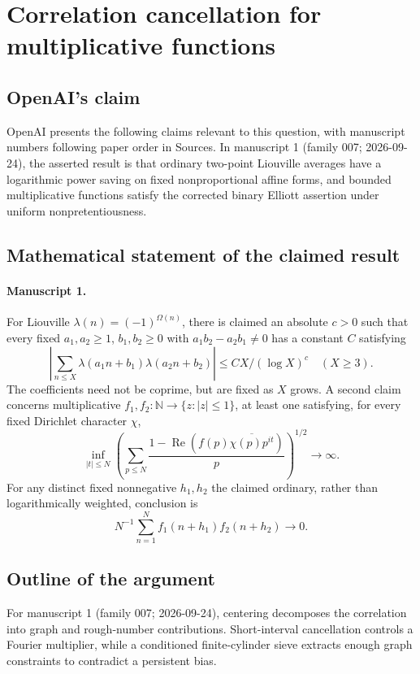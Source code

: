\documentclass[11pt]{article}
\begin{document}
\section*{Correlation cancellation for multiplicative functions}

\subsection{OpenAI's claim}
OpenAI presents the following claims relevant to this question, with manuscript numbers following paper order in Sources. In manuscript 1 (family 007; 2026-09-24), the asserted result is that ordinary two-point Liouville averages have a logarithmic power saving on fixed nonproportional affine forms, and bounded multiplicative functions satisfy the corrected binary Elliott assertion under uniform nonpretentiousness.

\subsection{Mathematical statement of the claimed result}
\paragraph{Manuscript 1.}
For Liouville $\lambda(n)=(-1)^{\Omega(n)}$, there is claimed an absolute $c>0$ such that every fixed $a_1,a_2\ge1$, $b_1,b_2\ge0$ with $a_1b_2-a_2b_1\ne0$ has a constant $C$ satisfying
\[
 |\sum_{n\le X}\lambda(a_1n+b_1)\lambda(a_2n+b_2)|\le C X/(\log X)^c\quad(X\ge3).
\]
The coefficients need not be coprime, but are fixed as $X$ grows. A second claim concerns multiplicative $f_1,f_2:\mathbb N\to\{z:|z|\le1\}$, at least one satisfying, for every fixed Dirichlet character $\chi$,
\[
 \inf_{|t|\le N}\left(\sum_{p\le N}\frac{1-\operatorname{Re}(f(p)\overline{\chi(p)p^{it}})}p\right)^{1/2}\longrightarrow\infty.
\]
For any distinct fixed nonnegative $h_1,h_2$ the claimed ordinary, rather than logarithmically weighted, conclusion is
\[
 N^{-1}\sum_{n=1}^Nf_1(n+h_1)f_2(n+h_2)\longrightarrow0.
\]

\subsection{Outline of the argument}
For manuscript 1 (family 007; 2026-09-24), centering decomposes the correlation into graph and rough-number contributions. Short-interval cancellation controls a Fourier multiplier, while a conditioned finite-cylinder sieve extracts enough graph constraints to contradict a persistent bias.
\end{document}
